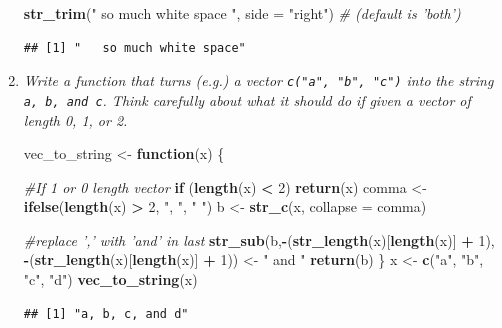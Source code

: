 \documentclass[]{book}
\newenvironment{Shaded}{\begin{snugshade}}{\end{snugshade}}
\newcommand{\CommentTok}[1]{\textcolor[rgb]{0.56,0.35,0.01}{\textit{#1}}}
\newcommand{\ControlFlowTok}[1]{\textcolor[rgb]{0.13,0.29,0.53}{\textbf{#1}}}
\newcommand{\DataTypeTok}[1]{\textcolor[rgb]{0.13,0.29,0.53}{#1}}
\newcommand{\DecValTok}[1]{\textcolor[rgb]{0.00,0.00,0.81}{#1}}
\newcommand{\KeywordTok}[1]{\textcolor[rgb]{0.13,0.29,0.53}{\textbf{#1}}}
\newcommand{\NormalTok}[1]{#1}
\newcommand{\OperatorTok}[1]{\textcolor[rgb]{0.81,0.36,0.00}{\textbf{#1}}}
\newcommand{\StringTok}[1]{\textcolor[rgb]{0.31,0.60,0.02}{#1}}
\theoremstyle{definition}
\theoremstyle{definition}
\theoremstyle{definition}
\theoremstyle{remark}
\begin{document}
\begin{enumerate}
\begin{Shaded}
\begin{Highlighting}[]
\KeywordTok{str_trim}\NormalTok{(}\StringTok{"   so much white space   "}\NormalTok{, }\DataTypeTok{side =} \StringTok{"right"}\NormalTok{) }\CommentTok{# (default is 'both')}
\end{Highlighting}
\end{Shaded}

\begin{verbatim}
## [1] "   so much white space"
\end{verbatim}
\item
  \emph{Write a function that turns (e.g.) a vector
  \texttt{c("a",\ "b",\ "c")} into} \emph{the string
  \texttt{a,\ b,\ and\ c}. Think carefully about what it should do if}
  \emph{given a vector of length 0, 1, or 2.}

\begin{Shaded}
\begin{Highlighting}[]
\NormalTok{vec_to_string <-}\StringTok{ }\ControlFlowTok{function}\NormalTok{(x) \{}

  \CommentTok{#If 1 or 0 length vector}
  \ControlFlowTok{if}\NormalTok{ (}\KeywordTok{length}\NormalTok{(x) }\OperatorTok{<}\StringTok{ }\DecValTok{2}\NormalTok{)}
  \KeywordTok{return}\NormalTok{(x)}
\NormalTok{  comma <-}\StringTok{ }\KeywordTok{ifelse}\NormalTok{(}\KeywordTok{length}\NormalTok{(x) }\OperatorTok{>}\StringTok{ }\DecValTok{2}\NormalTok{, }\StringTok{", "}\NormalTok{, }\StringTok{" "}\NormalTok{)}
\NormalTok{  b <-}\StringTok{ }\KeywordTok{str_c}\NormalTok{(x, }\DataTypeTok{collapse =}\NormalTok{ comma)}

  \CommentTok{#replace ',' with 'and' in last}
  \KeywordTok{str_sub}\NormalTok{(b,}\OperatorTok{-}\NormalTok{(}\KeywordTok{str_length}\NormalTok{(x)[}\KeywordTok{length}\NormalTok{(x)] }\OperatorTok{+}\StringTok{ }\DecValTok{1}\NormalTok{), }\OperatorTok{-}\NormalTok{(}\KeywordTok{str_length}\NormalTok{(x)[}\KeywordTok{length}\NormalTok{(x)] }\OperatorTok{+}
\StringTok{  }\DecValTok{1}\NormalTok{)) <-}\StringTok{ " and "}
  \KeywordTok{return}\NormalTok{(b)}
\NormalTok{\}}
\NormalTok{x <-}\StringTok{ }\KeywordTok{c}\NormalTok{(}\StringTok{"a"}\NormalTok{, }\StringTok{"b"}\NormalTok{, }\StringTok{"c"}\NormalTok{, }\StringTok{"d"}\NormalTok{)}
\KeywordTok{vec_to_string}\NormalTok{(x)}
\end{Highlighting}
\end{Shaded}

\begin{verbatim}
## [1] "a, b, c, and d"
\end{verbatim}
\end{enumerate}
\end{document}
